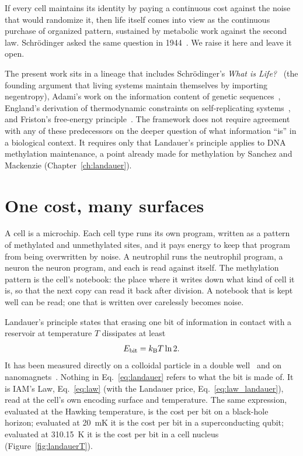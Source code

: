 If every cell maintains its identity by paying a continuous cost against the noise that would randomize it, then life itself comes into view
as the continuous purchase of organized pattern, sustained by metabolic work against the second law. Schr\"odinger asked the same question in
1944~\cite{SchrodingerWhatIsLife}. We raise it here and leave it open. \interp

The present work sits in a lineage that includes Schr\"odinger's \emph{What is Life?}~\cite{SchrodingerWhatIsLife} (the
founding argument that living systems maintain themselves by importing negentropy), Adami's work on the information content
of genetic sequences~\cite{Adami2002}, England's derivation of thermodynamic constraints on self-replicating
systems~\cite{England2013}, and Friston's free-energy principle~\cite{Friston2010}. The framework does not require agreement
with any of these predecessors on the deeper question of what information ``is'' in a biological context. It requires only
that Landauer's principle applies to DNA methylation maintenance, a point already made for methylation by Sanchez and
Mackenzie (Chapter~\ref{ch:landauer}). \interp

\section{One cost, many surfaces}

A cell is a microchip. Each cell type runs its own program, written as a pattern of methylated and unmethylated sites, and it pays energy
to keep that program from being overwritten by noise. A neutrophil runs the neutrophil program, a neuron the neuron program, and each is read
against itself. The methylation pattern is the cell's notebook: the place where it writes down what kind of cell it is, so that the next copy
can read it back after division. A notebook that is kept well can be read; one that is written over carelessly becomes noise. \analogy


Landauer's principle states that erasing one bit of information in contact with a reservoir at
temperature $T$ dissipates at least~\cite{Landauer1961,Bennett1982}
\begin{equation}
  E_{\mathrm{bit}}=k_{\mathrm B} T\ln 2 .
  \label{eq:landauer}
\end{equation}
It has been measured directly on a colloidal particle in a double well~\cite{Berut2012} and on
nanomagnets~\cite{Hong2016}. \observed{} Nothing in Eq.~\eqref{eq:landauer} refers to what the bit is made of. It is IAM's Law, Eq.~\eqref{eq:law} (with the Landauer price, Eq.~\eqref{eq:law_landauer}), read at the cell's own encoding surface and temperature.
The same expression, evaluated at the Hawking temperature, is the cost per bit on a black-hole
horizon; evaluated at 20~mK it is the cost per bit in a superconducting qubit; evaluated at
310.15~K it is the cost per bit in a cell nucleus (Figure~\ref{fig:landauerT}).

